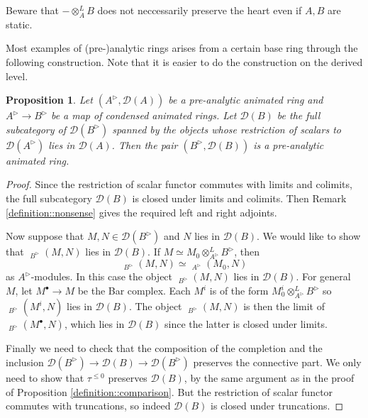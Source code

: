 \documentclass{article}
\theoremstyle{plain}
\newtheorem{prop}[thm]{Proposition}
\theoremstyle{definition}
\theoremstyle{remark}
\DeclareMathOperator{\rhoms}{\underline{RHom}}
\newcommand{\dten}{\otimes ^{L}}
\newcommand{\huflag}{\triangleright}
\newcommand{\D}{\mathcal{D}}
\begin{document}
Beware that $ -\dten _{A} B $ does not neccessarily preserve the heart even if $ A,B $ are static.

Most examples of (pre-)analytic rings arises from a certain base ring through the following construction.
Note that it is easier to do the construction on the derived level.
\begin{prop}
Let $ (A ^{\huflag}, \D (A)) $ be a pre-analytic animated ring and $ A ^{\huflag}\to B ^{\huflag} $ be a map of condensed animated rings.
Let $ \D (B) $ be the full subcategory of $ \D (B ^{\huflag}) $ spanned by the objects whose restriction of scalars to $ \D (A ^{\huflag}) $
lies in $ \D (A) $. Then the pair $ (B ^{\huflag}, \D (B)) $ is a pre-analytic animated ring.
\end{prop}

\begin{proof}
Since the restriction of scalar functor commutes with limits and colimits, the full subcategory
$ \D (B) $ is closed under limits and colimits.
Then Remark \ref{definition::nonsense} gives the required left and right adjoints.

Now suppose that $ M, N\in \D (B ^{\huflag}) $ and $ N $ lies in $ \D (B) $.
We would like to show that $ \rhoms _{B ^{\huflag}}(M, N) $ lies in $ \D (B) $.
If $ M \simeq M_0 \dten _{A ^{\huflag}} B ^{\huflag} $,
then
\begin{equation*}
\rhoms _{B ^{\huflag}}(M, N)\simeq \rhoms _{A ^{\huflag}}(M_0, N)
\end{equation*}
as $ A ^{\huflag} $-modules.
In this case the object $ \rhoms _{B ^{\huflag}}(M, N) $ lies in $ \D (B) $.
For general $ M $, let $ M ^{\bullet}\to M $ be the Bar complex. Each $ M ^{i} $ is of the form $ M ^{i}_{0}\dten _{A ^{\huflag}}B ^{\huflag} $
so $ \rhoms _{B ^{\huflag}}(M ^{i}, N) $ lies in $ \D (B) $.
The object $ \rhoms _{B ^{\huflag}}(M, N) $ is then the limit of $ \rhoms _{B ^{\huflag}}(M ^{\bullet}, N) $,
which lies in $ \D (B) $ since the latter is closed under limits.

Finally we need to check that the composition of the completion and the inclusion
$ \D (B ^{\huflag})\to \D (B)\to \D (B ^{\huflag}) $ preserves the connective part.
We only need to show that $ \tau ^{\leq 0} $ preserves $ \D (B) $, by the same argument as in the proof of Proposition
\ref{definition::comparison}.
But the restriction of scalar functor commutes with truncations, so indeed $ \D (B) $ is closed under truncations.
\end{proof}
\end{document}
